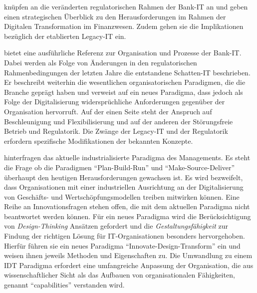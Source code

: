 \citet{Strietzel2018} knüpfen an die veränderten regulatorischen Rahmen der Bank-IT an und geben einen strategischen Überblick zu den Herausforderungen im Rahmen der Digitalen Transformation im Finanzwesen. Zudem gehen sie die Implikationen bezüglich der etablierten Legacy-IT ein.

\citet{Dorschel2018} bietet eine ausführliche Referenz zur Organisation und Prozesse der Bank-IT. Dabei werden als Folge von Änderungen in den regulatorischen Rahmenbedingungen der letzten Jahre die entstandene Schatten-IT beschrieben. Er beschreibt weiterhin die wesentlichen organisatorischen Paradigmen, die die Branche geprägt haben und verweist auf ein neues Paradigma, dass jedoch als Folge der Digitalisierung widersprüchliche Anforderungen gegenüber der Organisation hervorruft. Auf der einen Seite steht der Anspruch auf Beschleunigung und Flexibilisierung und auf der anderen der Störungsfreie Betrieb und Regulatorik. Die Zwänge der Legacy-IT und der Regulatorik erfordern spezifische Modifikationen der bekannten Konzepte.

\citet{Koch2016} hinterfragen das aktuelle industrialisierte Paradigma des Managements. Es steht die Frage ob die Paradigmen \enquote{Plan-Build-Run} und \enquote{Make-Source-Deliver} überhaupt den heutigen Herausforderungen gewachsen ist. Es wird bezweifelt, dass Organisationen mit einer industriellen Ausrichtung an der Digitalisierung von Geschäfts- und Wertschöpfungsmodellen treiben mitwirken können. Eine Reihe an Innovationsfragen stehen offen, die mit dem aktuellen Paradigma nicht beantwortet werden können. Für ein neues Paradigma wird die Berücksichtigung von \emph{Design-Thinking} Ansätzen gefordert und die \emph{Gestaltungsfähigkeit} zur Findung der richtigen Lösung für IT-Organisationen besonders hervorgehoben. Hierfür führen sie ein neues Paradigma \enquote{Innovate-Design-Transform} ein und weisen ihnen jeweils Methoden und Eigenschaften zu. Die Umwandlung zu einem \ac{IDT} Paradigma erfordert eine umfangreiche Anpassung der Organisation, die aus wissenschaftlicher Sicht als das Aufbauen von organisationalen Fähigkeiten, genannt \enquote{capabilities} verstanden wird.

